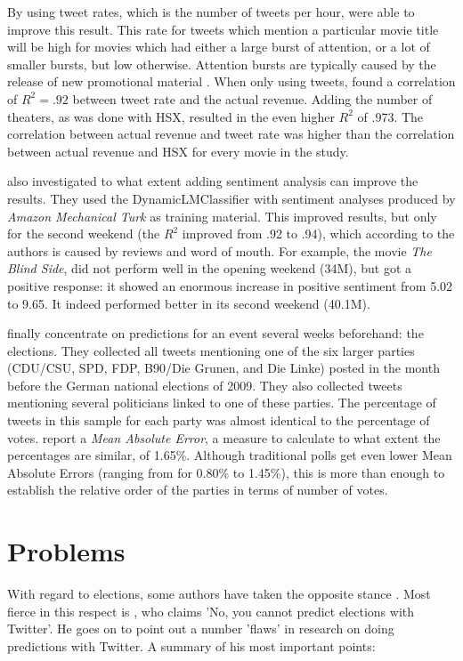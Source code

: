 \documentclass[12pt]{article}
\begin{document}
By using tweet rates, which is the number of tweets per hour,  were able to improve this result. This rate for tweets which mention a particular movie title will be high for movies which had either a large burst of attention, or a lot of smaller bursts, but low otherwise. Attention bursts are typically caused by the release of new promotional material \cite{asur+10}. When only using tweets,  found a correlation of $R^2 = .92$ between tweet rate and the actual revenue. Adding the number of theaters, as was done with HSX, resulted in the even higher $R^2$ of .973. The correlation between actual revenue and tweet rate was higher than the correlation between actual revenue and HSX for every movie in the study.

 also investigated to what extent adding sentiment analysis can improve the results. They used the DynamicLMClassifier with sentiment analyses produced by \emph{Amazon Mechanical Turk} as training material. This improved results, but only for the second weekend (the $R^2$ improved from .92 to .94), which according to the authors is caused by reviews and word of mouth. For example, the movie \emph{The Blind Side}, did not perform well in the opening weekend (34M), but got a positive response: it showed an enormous increase in positive sentiment from 5.02 to 9.65. It indeed performed better in its second weekend (40.1M). 

 finally concentrate on predictions for an event several weeks beforehand: the elections. They collected all tweets mentioning one of the six larger parties (CDU/CSU, SPD, FDP, B90/Die Grunen, and Die Linke) posted in the month before the German national elections of 2009. They also collected tweets mentioning several politicians linked to one of these parties. The percentage of tweets in this sample for each party was almost identical to the percentage of votes.  report a \emph{Mean Absolute Error}, a measure to calculate to what extent the percentages are similar, of 1.65\%. Although traditional polls get even lower Mean Absolute Errors (ranging from for 0.80\% to 1.45\%), this is more than enough to establish the relative order of the parties in terms of number of votes. 

\section{Problems} \label{problems}

With regard to elections, some authors have taken the opposite stance . Most fierce in this respect is , who claims 'No, you cannot predict elections with Twitter'. He goes on to point out a number 'flaws' in research on doing predictions with Twitter. A summary of his most important points:
\end{document}
